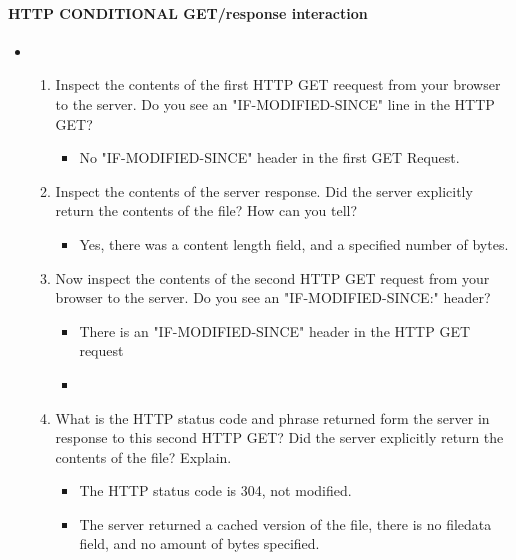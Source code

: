 \documentclass{article}
\begin{document}
  
  \paragraph{HTTP CONDITIONAL GET/response interaction}
  \begin{itemize}
    \item\begin{enumerate}
      \item Inspect the contents of the first HTTP GET reequest from your browser to the server.  Do you see an "IF-MODIFIED-SINCE" line in the HTTP GET? 
        \begin{itemize}
          \item No "IF-MODIFIED-SINCE" header in the first GET Request. 
        \end{itemize}
      \item Inspect the contents of the server response.  Did the server explicitly return the contents of the file? How can you tell?
      \begin{itemize}
        \item Yes, there was a content length field, and a specified number of bytes.
      \end{itemize}
      \item Now inspect the contents of the second HTTP GET request from your browser to the server.  Do you see an "IF-MODIFIED-SINCE:" header?
        \begin{itemize}
          \item There is an "IF-MODIFIED-SINCE" header in the HTTP GET request
          \item 
        \end{itemize}
      \item What is the HTTP status code and phrase returned form the server in response to this second HTTP GET? Did the server explicitly return the contents of the file? Explain.
        \begin{itemize}
          \item The HTTP status code is 304, not modified.
          \item The server returned a cached version of the file, there is no filedata field, and no amount of bytes specified.
        \end{itemize}
    \end{enumerate}
  \end{itemize}
\end{document}

